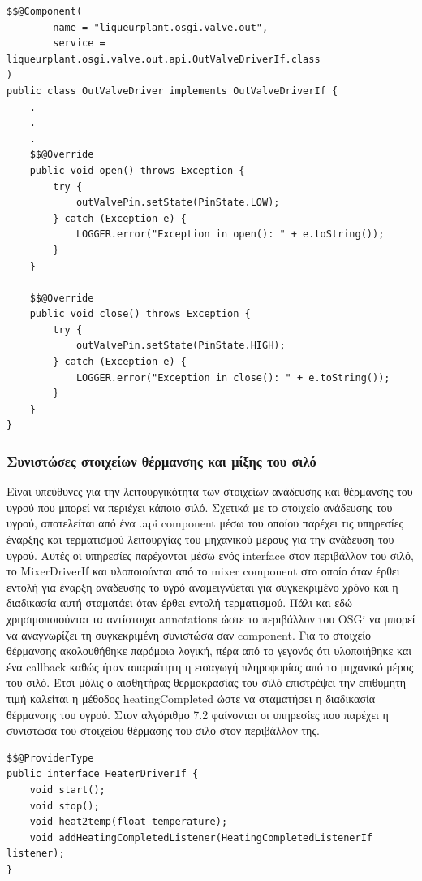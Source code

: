 \newpage

\begin{lstlisting}[caption=Μέρος της υλοποίησης της συνιστώσας την βαλβίδας εξαγωγής υγρού]
$$@Component(
        name = "liqueurplant.osgi.valve.out",
        service = liqueurplant.osgi.valve.out.api.OutValveDriverIf.class
)
public class OutValveDriver implements OutValveDriverIf {
	.
	.
	.
    $$@Override
    public void open() throws Exception {
        try {
            outValvePin.setState(PinState.LOW);
        } catch (Exception e) {
            LOGGER.error("Exception in open(): " + e.toString());
        }
    }

    $$@Override
    public void close() throws Exception {
        try {
            outValvePin.setState(PinState.HIGH);
        } catch (Exception e) {
            LOGGER.error("Exception in close(): " + e.toString());
        }
    }
}
\end{lstlisting}

\subsubsection{Συνιστώσες στοιχείων θέρμανσης και μίξης του σιλό}
Είναι υπεύθυνες για την λειτουργικότητα των στοιχείων ανάδευσης και θέρμανσης του υγρού που μπορεί να περιέχει κάποιο σιλό. Σχετικά με το στοιχείο ανάδευσης του υγρού, αποτελείται από ένα .api component μέσω του οποίου παρέχει τις υπηρεσίες έναρξης και τερματισμού λειτουργίας του μηχανικού μέρους για την ανάδευση του υγρού. Αυτές οι υπηρεσίες παρέχονται μέσω ενός interface στον περιβάλλον του σιλό, το MixerDriverIf και υλοποιούνται από το mixer component στο οποίο όταν έρθει εντολή για έναρξη ανάδευσης το υγρό αναμειγνύεται για συγκεκριμένο χρόνο και η διαδικασία αυτή σταματάει όταν έρθει εντολή τερματισμού. Πάλι και εδώ χρησιμοποιούνται τα αντίστοιχα annotations ώστε το περιβάλλον του OSGi να μπορεί να αναγνωρίζει τη συγκεκριμένη συνιστώσα σαν component. Για το στοιχείο θέρμανσης ακολουθήθηκε παρόμοια λογική, πέρα από το γεγονός ότι υλοποιήθηκε και ένα callback καθώς ήταν απαραίτητη η εισαγωγή πληροφορίας από το μηχανικό μέρος του σιλό. Έτσι μόλις ο αισθητήρας θερμοκρασίας του σιλό επιστρέψει την επιθυμητή τιμή καλείται η μέθοδος heatingCompleted ώστε να σταματήσει η διαδικασία θέρμανσης του υγρού. Στον αλγόριθμο 7.2 φαίνονται οι υπηρεσίες που παρέχει η συνιστώσα του στοιχείου θέρμασης του σιλό στον περιβάλλον της. 


\begin{lstlisting}[caption=Οι υπηρεσίες που παρέχει η συνιστώσα του στοιχείου θέρμανσης]
$$@ProviderType
public interface HeaterDriverIf {
    void start();
    void stop();
    void heat2temp(float temperature);
    void addHeatingCompletedListener(HeatingCompletedListenerIf listener);
}

\end{lstlisting}

